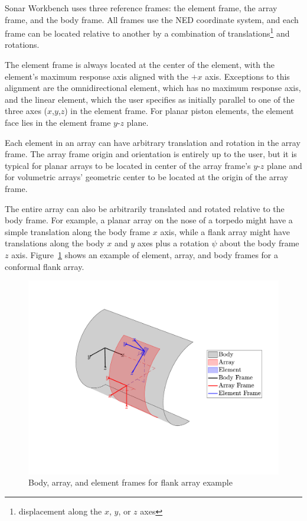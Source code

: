 \documentclass[11pt]{article}
\renewcommand{\figurename}{Figure}
\begin{document}
Sonar Workbench uses three reference frames: the element frame, the array frame, and the body frame. All frames use the NED coordinate system, and each frame can be located relative to another by a combination of translations\footnote{displacement along the $x$, $y$, or $z$ axes} and rotations.

The element frame is always located at the center of the element, with the element's maximum response axis aligned with the $+x$ axis. Exceptions to this alignment are the omnidirectional element, which has no maximum response axis, and the linear element, which the user specifies as initially parallel to one of the three axes ($x$,$y$,$z$) in the element frame. For planar piston elements, the element face lies in the element frame $y$-$z$ plane.

Each element in an array can have arbitrary translation and rotation in the array frame. The array frame origin and orientation is entirely up to the user, but it is typical for planar arrays to be located in center of the array frame's $y$-$z$ plane and for volumetric arrays' geometric center to be located at the origin of the array frame.

The entire array can also be arbitrarily translated and rotated relative to the body frame. For example, a planar array on the nose of a torpedo might have a simple translation along the body frame $x$ axis, while a flank array might have translations along the body $x$ and $y$ axes plus a rotation $\psi$ about the body frame $z$ axis. \figurename~\ref{fig:ReferenceFrames} shows an example of element, array, and body frames for a conformal flank array.

\begin{figure}[!ht]
\begin{center}
\includegraphics[width=\textwidth]{BodyArrayElementFrame}
\caption{\label{fig:ReferenceFrames}Body, array, and element frames for flank array example}
\end{center}
\end{figure}
\end{document}
